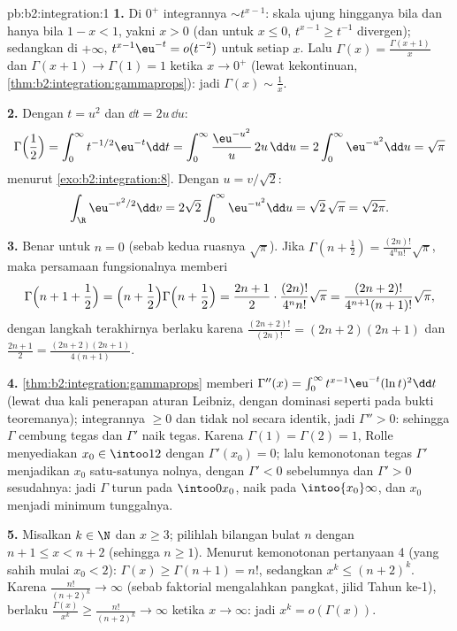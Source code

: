 \begin{solution}{pb:b2:integration:1}
\textbf{1.} Di $0^+$ integrannya $\sim t^{x-1}$: skala ujung
hingganya  bila dan hanya bila $1 - x < 1$, yakni $x > 0$
(dan untuk $x \leq 0$, $t^{x-1} \geq t^{-1}$ divergen); sedangkan di
$+\infty$, $t^{x-1}\eu^{-t} = o(t^{-2})$  untuk setiap
$x$. Lalu $\Gamma(x) = \frac{\Gamma(x+1)}{x}$ dan $\Gamma(x+1)
\to \Gamma(1) = 1$ ketika $x \to 0^+$ (lewat kekontinuan,
\cref{thm:b2:integration:gammaprops}): jadi $\Gamma(x) \sim
\frac1x$.

\textbf{2.} Dengan $t = u^2$ dan $\dd t = 2u\,\dd u$:
\[
\Gamma\Bigl(\frac12\Bigr) = \int_0^\infty
t^{-1/2}\eu^{-t}\dd t
= \int_0^\infty \frac{\eu^{-u^2}}{u}\,2u\,\dd u
= 2\int_0^\infty \eu^{-u^2}\dd u = \sqrt\pi
\]
menurut \cref{exo:b2:integration:8}. Dengan $u = v/\sqrt2$:
\[
\int_\R \eu^{-v^2/2}\dd v
= 2\sqrt2\int_0^\infty \eu^{-u^2}\dd u
= \sqrt2\,\sqrt\pi = \sqrt{2\pi} .
\]

\textbf{3.} Benar untuk $n = 0$ (sebab kedua ruasnya $\sqrt\pi$). Jika
$\Gamma(n + \frac12) = \frac{(2n)!}{4^n n!}\sqrt\pi$, maka
persamaan fungsionalnya memberi
\[
\Gamma\Bigl(n + 1 + \frac12\Bigr)
= \Bigl(n + \frac12\Bigr)\Gamma\Bigl(n + \frac12\Bigr)
= \frac{2n+1}{2}\cdot\frac{(2n)!}{4^n n!}\sqrt\pi
= \frac{(2n+2)!}{4^{n+1}(n+1)!}\sqrt\pi ,
\]
dengan langkah terakhirnya berlaku karena $\frac{(2n+2)!}{(2n)!} =
(2n+2)(2n+1)$ dan $\frac{2n+1}{2} = \frac{(2n+2)(2n+1)}{4(n+1)}$.

\textbf{4.} \cref{thm:b2:integration:gammaprops} memberi
$\Gamma''(x) = \int_0^\infty t^{x-1}\eu^{-t}(\ln t)^2\dd t$
(lewat dua kali penerapan aturan Leibniz, dengan dominasi seperti pada
bukti teoremanya); integrannya $\geq 0$ dan tidak nol secara
identik, jadi $\Gamma'' > 0$: sehingga $\Gamma$ cembung tegas dan
$\Gamma'$ naik tegas. Karena $\Gamma(1) = \Gamma(2) = 1$, Rolle
menyediakan $x_0 \in \intoo12$ dengan $\Gamma'(x_0) = 0$; lalu
kemonotonan tegas $\Gamma'$ menjadikan $x_0$ satu-satunya nolnya,
dengan $\Gamma' < 0$ sebelumnya dan $\Gamma' > 0$ sesudahnya: jadi
$\Gamma$ turun pada $\intoo0{x_0}$, naik pada
$\intoo{x_0}\infty$, dan $x_0$ menjadi minimum tunggalnya.

\textbf{5.} Misalkan $k \in \N$ dan $x \geq 3$; pilihlah bilangan bulat
$n$ dengan $n + 1 \leq x < n + 2$ (sehingga $n \geq 1$). Menurut
kemonotonan pertanyaan 4 (yang sahih mulai $x_0 < 2$): $\Gamma(x)
\geq \Gamma(n + 1) = n!$, sedangkan $x^k \leq (n+2)^k$. Karena
$\frac{n!}{(n+2)^k} \to \infty$ (sebab faktorial mengalahkan pangkat,
jilid Tahun ke-1), berlaku $\frac{\Gamma(x)}{x^k} \geq
\frac{n!}{(n+2)^k} \to \infty$ ketika $x \to \infty$: jadi $x^k =
o(\Gamma(x))$.


\end{solution}

